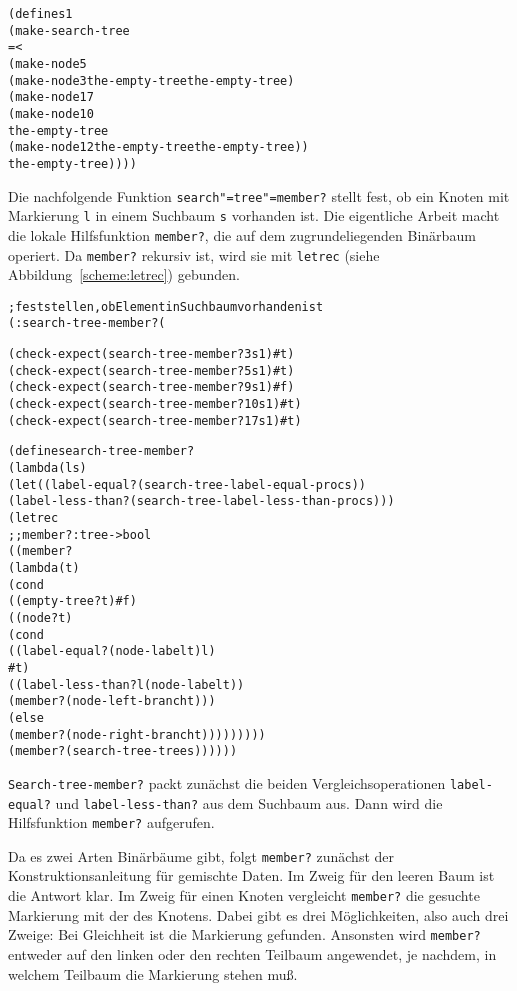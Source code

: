 \begin{alltt}
(define s1
  (make-search-tree
   = <
   (make-node 5
              (make-node 3 the-empty-tree the-empty-tree)
              (make-node 17
                         (make-node 10 
                                    the-empty-tree 
                                    (make-node 12 the-empty-tree the-empty-tree))
                         the-empty-tree))))
\end{alltt}
%
Die nachfolgende Funktion \texttt{search"=tree"=member?} 
stellt fest, ob ein Knoten mit Markierung \texttt{l} in einem
Suchbaum \texttt{s} vorhanden ist. Die eigentliche Arbeit
macht die lokale Hilfsfunktion \texttt{member?},
die auf dem zugrundeliegenden Binärbaum operiert.  Da \texttt{member?} rekursiv
ist, wird sie mit \texttt{letrec} (siehe
Abbildung~\ref{scheme:letrec}) gebunden.
%
\begin{alltt}
; feststellen, ob Element in Suchbaum vorhanden ist
(: search-tree-member? (%a (search-tree-of %a) -> boolean))

(check-expect (search-tree-member? 3 s1) #t)
(check-expect (search-tree-member? 5 s1) #t)
(check-expect (search-tree-member? 9 s1) #f)
(check-expect (search-tree-member? 10 s1) #t)
(check-expect (search-tree-member? 17 s1) #t)

(define search-tree-member?
  (lambda (l s)
    (let ((label-equal? (search-tree-label-equal-proc s))
          (label-less-than? (search-tree-label-less-than-proc s)))
      (letrec
          ;; member? : tree -> bool
          ((member?
            (lambda (t)
              (cond
               ((empty-tree? t) #f)
               ((node? t)
                (cond                 
                  ((label-equal? (node-label t) l)
                   #t)
                  ((label-less-than? l (node-label t))
                   (member? (node-left-branch t)))
                  (else
                   (member? (node-right-branch t)))))))))
        (member? (search-tree-tree s))))))
\end{alltt}
%
\texttt{Search-tree-member?} packt zunächst die beiden
Vergleichsoperationen \texttt{label-equal?} und
\texttt{label-less-than?} aus dem Suchbaum aus.
Dann wird die Hilfsfunktion \texttt{member?} aufgerufen.

Da es zwei Arten Binärbäume gibt, folgt 
\texttt{member?} zunächst der Konstruktionsanleitung für
gemischte Daten.  Im Zweig für den leeren Baum ist die Antwort
klar.  Im Zweig für einen Knoten vergleicht \texttt{member?} die
gesuchte Markierung mit der des Knotens.  Dabei gibt es drei
Möglichkeiten, also auch drei Zweige: Bei Gleichheit ist die Markierung
gefunden.  Ansonsten wird \texttt{member?} entweder auf den linken
oder den rechten Teilbaum angewendet, je nachdem, in welchem Teilbaum
die Markierung stehen muß.

